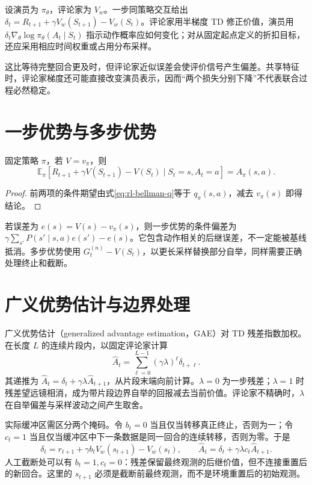 \documentclass[UTF8,12pt,a4paper,fontset=fandol]{ctexbook}
\begin{document}
设演员为 $\pi_\theta$，评论家为 $V_w$。一步同策略交互给出 $\delta_t=R_{t+1}+\gamma V_w(S_{t+1})-V_w(S_t)$。评论家用半梯度 TD 修正价值，演员用 $\delta_t\nabla_\theta\log\pi_\theta(A_t\mid S_t)$ 指示动作概率应如何变化；对从固定起点定义的折扣目标，还应采用相应时间权重或占用分布采样。

这比等待完整回合更及时，但评论家近似误差会使评价信号产生偏差。共享特征时，评论家梯度还可能直接改变演员表示，因而“两个损失分别下降”不代表联合过程必然稳定。

\section{一步优势与多步优势}

\begin{proposition}[精确价值下的 TD 优势]
固定策略 $\pi$，若 $V=v_\pi$，则
\[
\mathbb E_\pi[R_{t+1}+\gamma V(S_{t+1})-V(S_t)\mid S_t=s,A_t=a]=A_\pi(s,a).
\]
\end{proposition}
\begin{proof}
前两项的条件期望由式\eqref{eq:rl-bellman-q}等于 $q_\pi(s,a)$，减去 $v_\pi(s)$ 即得结论。
\end{proof}

若误差为 $e(s)=V(s)-v_\pi(s)$，则一步优势的条件偏差为 $\gamma\sum_{s'}P(s'\mid s,a)e(s')-e(s)$。它包含动作相关的后继误差，不一定能被基线抵消。多步优势使用 $G_t^{(n)}-V(S_t)$，以更长采样替换部分自举，同样需要正确处理终止和截断。

\section{广义优势估计与边界处理}

广义优势估计（generalized advantage estimation，GAE）\cite{schulman-gae}对 TD 残差指数加权。在长度 $L$ 的连续片段内，以固定评论家计算
\[
\widehat A_t=\sum_{\ell=0}^{L-1}(\gamma\lambda)^\ell\delta_{t+\ell}.
\]
其递推为 $\widehat A_t=\delta_t+\gamma\lambda\widehat A_{t+1}$，从片段末端向前计算。$\lambda=0$ 为一步残差；$\lambda=1$ 时残差望远镜相消，成为带片段边界自举的回报减去当前价值。评论家不精确时，$\lambda$ 在自举偏差与采样波动之间产生取舍。

实际缓冲区需区分两个掩码。令 $b_t=0$ 当且仅当转移真正终止，否则为一；令 $c_t=1$ 当且仅当缓冲区中下一条数据是同一回合的连续转移，否则为零。于是
\begin{equation}
\delta_t=r_{t+1}+\gamma b_tV_w(s_{t+1})-V_w(s_t),\qquad
\widehat A_t=\delta_t+\gamma\lambda c_t\widehat A_{t+1}.
\label{eq:rl-gae-masks}
\end{equation}
人工截断处可以有 $b_t=1,c_t=0$：残差保留最终观测的后继价值，但不连接重置后的新回合。这里的 $s_{t+1}$ 必须是截断前最终观测，而不是环境重置后的初始观测。
\end{document}

